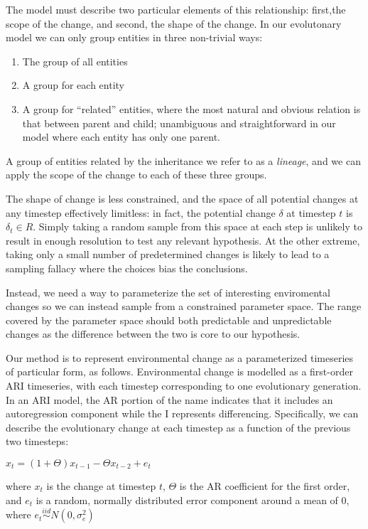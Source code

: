 \documentclass[]{report}
\begin{document}
The model must describe two particular elements of this relationship: first,the scope of the change, and second, the shape of the change. In our evolutonary model we can only group entities in three non-trivial ways:
\begin{enumerate}
	\item The group of all entities
	\item A group for each entity
	\item A group for ``related'' entities, where the most natural and obvious relation is that between parent and child; unambiguous and straightforward in our model where each entity has only one parent.
\end{enumerate}

A group of entities related by the inheritance we refer to as a \emph{lineage}, and we can apply the scope of the change to each of these three groups.

The shape of change is less constrained, and the space of all potential changes at any timestep effectively limitless: in fact, the potential change $\delta$ at timestep $t$ is $\delta_t\in R$. Simply taking a random sample from this space at each step is unlikely to result in enough resolution to test any relevant hypothesis. At the other extreme, taking only a small number of predetermined changes is likely to lead to a sampling fallacy where the choices bias the conclusions.

Instead, we need a way to parameterize the set of interesting enviromental changes so we can instead sample from a constrained parameter space. The range covered by the parameter space should both predictable and unpredictable changes as the difference between the two is core to our hypothesis.

Our method is to represent environmental change as a parameterized timeseries of particular form, as follows. Environmental change is modelled as a first-order ARI timeseries, with each timestep corresponding to one evolutionary generation. In an ARI model, the AR portion of the name indicates that it includes an autoregression component while the I represents differencing. Specifically, we can describe the evolutionary change at each timestep as a function of the previous two timesteps:

$x_t = (1+\Theta)x_{t-1} - \Theta x_{t-2} + e_t$

where $x_t$ is the change at timestep $t$, $\Theta$ is the AR coefficient for the first order, and $e_t$ is a random, normally distributed error component around a mean of $0$, where $e_t\stackrel{iid}{\sim}N(0,\sigma^{2}_e)$
\end{document}
